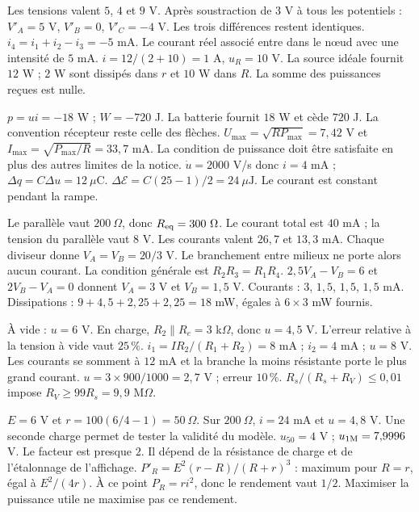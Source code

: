 Les tensions valent $5$, $4$ et $9$ V. Après soustraction de $3$ V à tous les potentiels : $V'_A=5$ V, $V'_B=0$, $V'_C=-4$ V. Les trois différences restent identiques.
$i_4=i_1+i_2-i_3=-5$ mA. Le courant réel associé entre dans le nœud avec une intensité de $5$ mA.
$i=12/(2+10)=1$ A, $u_R=10$ V. La source idéale fournit $12$ W ; $2$ W sont dissipés dans $r$ et $10$ W dans $R$. La somme des puissances reçues est nulle.


$p=ui=-18$ W ; $W=-720$ J. La batterie fournit $18$ W et cède $720$ J. La convention récepteur reste celle des flèches.
$U_{\max}=\sqrt{RP_{\max}}=7{,}42$ V et $I_{\max}=\sqrt{P_{\max}/R}=33{,}7$ mA. La condition de puissance doit être satisfaite en plus des autres limites de la notice.
$\dot u=2000$ V/s donc $i=4$ mA ; $\Delta q=C\Delta u=12\ \mu\mathrm{ C}$. $\Delta\mathcal E=C(25-1)/2=24\ \mu\mathrm{ J}$. Le courant est constant pendant la rampe.


Le parallèle vaut $200\ \Omega$, donc $R_{\rm eq}=300\ \Omega$. Le courant total est $40$ mA ; la tension du parallèle vaut $8$ V. Les courants valent $26{,}7$ et $13{,}3$ mA.
Chaque diviseur donne $V_A=V_B=20/3$ V. Le branchement entre milieux ne porte alors aucun courant. La condition générale est $R_2R_3=R_1R_4$.
$2{,}5V_A-V_B=6$ et $2V_B-V_A=0$ donnent $V_A=3$ V et $V_B=1{,}5$ V. Courants : $3$, $1{,}5$, $1{,}5$, $1{,}5$ mA. Dissipations : $9+4{,}5+2{,}25+2{,}25=18$ mW, égales à $6\times3$ mW fournis.


À vide : $u=6$ V. En charge, $R_2\parallel R_e=3$ k$\Omega$, donc $u=4{,}5$ V. L’erreur relative à la tension à vide vaut $25\,\%$.
$i_1=I R_2/(R_1+R_2)=8$ mA ; $i_2=4$ mA ; $u=8$ V. Les courants se somment à $12$ mA et la branche la moins résistante porte le plus grand courant.
$u=3\times900/1000=2{,}7$ V ; erreur $10\,\%$. $R_s/(R_s+R_V)\leq0{,}01$ impose $R_V\geq99R_s=9{,}9$ M$\Omega$.


$E=6$ V et $r=100(6/4-1)=50\ \Omega$. Sur $200\ \Omega$, $i=24$ mA et $u=4{,}8$ V. Une seconde charge permet de tester la validité du modèle.
$u_{50}=4$ V ; $u_{1\rm M}=7{,}9996$ V. Le facteur est presque $2$. Il dépend de la résistance de charge et de l’étalonnage de l’affichage.
$P'_R=E^2(r-R)/(R+r)^3$ : maximum pour $R=r$, égal à $E^2/(4r)$. À ce point $P_R=ri^2$, donc le rendement vaut $1/2$. Maximiser la puissance utile ne maximise pas ce rendement.


